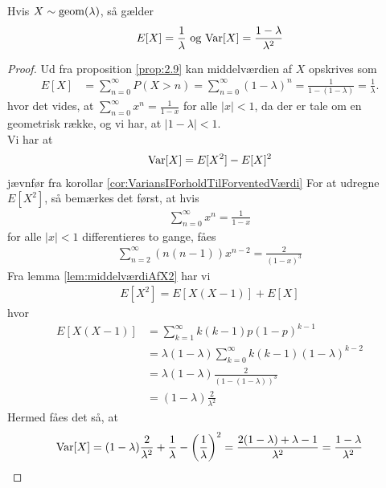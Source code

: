 \begin{prop} %
\label{prop:geomEgenskaber}
Hvis $X \sim \textnormal{geom} (\lambda)$, så gælder 
\begin{align*}
    E[X] = \frac{1}{\lambda} \text{ og } \textnormal{Var}[X] = \frac{1-\lambda}{\lambda^2}
\end{align*}
\end{prop}

\begin{proof}
    Ud fra proposition \ref{prop:2.9} kan middelværdien af $X$ opskrives som
    \begin{align*}
      E[X] &= \sum_{n=0}^{\infty} P(X > n) =\sum_{n=0}^\infty(1-\lambda)^n=\frac{1}{1-(1-\lambda)}=\frac{1}{\lambda}.
    \end{align*}
    hvor det vides, at $\sum_{n=0}^\infty x^n=\frac{1}{1-x}$ for alle $|x|<1$, da der er tale om en geometrisk række, og vi har, at $|1 - \lambda|<1$.\\
    Vi har at
    \begin{align*}
        \textnormal{Var}[X] =E[X^2]-E[X]^2
    \end{align*}
    jævnfør fra korollar \ref{cor:VariansIForholdTilForventedVærdi}
    For at udregne $E[X^2]$, så bemærkes det først, at hvis
    \begin{align*}
        \sum^\infty_{n=0}x^n=\frac{1}{1-x}
    \end{align*}
    for alle $|x|<1$ differentieres to gange, fåes 
    \begin{align*}
        \sum^\infty_{n=2}(n(n-1))x^{n-2}=\frac{2}{(1-x)^3}
    \end{align*}
    Fra lemma \ref{lem:middelværdiAfX2} har vi
    \begin{align*}
        E[X^2]=E[X(X-1)]+E[X]
    \end{align*}
    hvor
    \begin{align*}
        E[X(X-1)]&= \sum_{k=1}^{\infty}k(k-1)p(1-p)^{k-1}\\
        &= \lambda(1-\lambda)\sum_{k=0}^{\infty}k(k-1)(1-\lambda)^{k-2}\\
        &=\lambda(1-\lambda)\frac{2}{(1-(1-\lambda))^3}
        \\
        &=(1-\lambda)\frac{2}{\lambda^2}
    \end{align*}
    Hermed fåes det så, at
    \begin{align*}
        \Var[X]=(1-\lambda)\frac{2}{\lambda^2}+\frac{1}{\lambda}-\left(\frac{1}{\lambda}\right)^2
        =\frac{2(1-\lambda)+\lambda-1}{\lambda^2}
        =\frac{1-\lambda}{\lambda^2}

\end{align*}
\end{proof}
